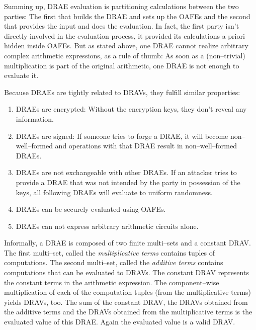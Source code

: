 Summing up, DRAE evaluation is partitioning calculations between the two
parties: The first that builds the DRAE and sets up the OAFEs and the second
that provides the input and does the evaluation. In fact, the first party isn't
directly involved in the evaluation process, it provided its calculations a
priori hidden inside OAFEs. But as stated above, one DRAE cannot realize
arbitrary complex arithmetic expressions, as a rule of thumb: As soon as a
(non--trivial) multiplication is part of the original arithmetic, one DRAE is
not enough to evaluate it.



Because DRAEs are tightly related to DRAVs, they fulfill similar properties:

\begin{enumerate}

  \item \label{prop:drae-encrypted} DRAEs are encrypted: Without the encryption
    keys, they don't reveal any information.

  \item \label{prop:drae-signed} DRAEs are signed: If someone tries to forge a
    DRAE, it will become non--well--formed and operations with that DRAE result
    in non--well--formed DRAEs.

  \item DRAEs are not exchangeable with other DRAEs. If an attacker tries to
    provide a DRAE that was not intended by the party in possession of the keys,
    all following DRAEs will evaluate to uniform randomness.

  \item \label{prop:drae-oafe} DRAEs can be securely evaluated using OAFEs.

  \item \label{prop:drae-not-enough} DRAEs can not express arbitrary arithmetic
    circuits alone.

\end{enumerate}

\noindent{}Informally, a DRAE is composed of two finite multi--sets and a
constant DRAV. The first multi--set, called the \emph{multiplicative terms}
contains tuples of computations. The second multi--set, called the
\emph{additive terms} contains computations that can be evaluated to DRAVs. The
constant DRAV represents the constant terms in the arithmetic expression. The
component--wise multiplication of each of the computation tuples (from the
multiplicative terms) yields DRAVs, too. The sum of the constant DRAV, the DRAVs
obtained from the additive terms and the DRAVs obtained from the multiplicative
terms is the evaluated value of this DRAE. Again the evaluated value is a valid
DRAV.

